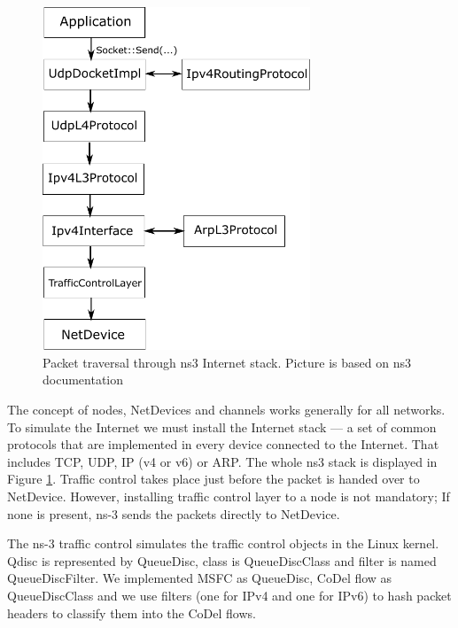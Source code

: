 \begin{figure}
	\centering
	\includegraphics[width=80mm]{drawings/ns3_internet_stack}
	\captionsetup{justification=centering}
	\caption{Packet traversal through ns3 Internet stack. Picture is based on ns3 documentation \cite[p. 88]{ns3Doc}}
	\label{fig13:ns3}
\end{figure}

The concept of nodes, NetDevices and channels works generally for all networks. To simulate the Internet we must install the Internet stack --- a set of common protocols that are implemented in every device connected to the Internet. That includes TCP, UDP, IP (v4 or v6) or ARP. The whole ns3 stack is displayed in Figure \ref{fig13:ns3}. Traffic control takes place just before the packet is handed over to NetDevice. However, installing traffic control layer to a node is not mandatory; If none is present, ns-3 sends the packets directly to NetDevice.

The ns-3 traffic control simulates the traffic control objects in the Linux kernel. Qdisc is represented by QueueDisc,  class is QueueDiscClass and  filter is named QueueDiscFilter. We implemented MSFC as QueueDisc, CoDel flow as QueueDiscClass  and we use filters (one for IPv4 and one for IPv6) to hash packet headers to classify them into the CoDel flows.


